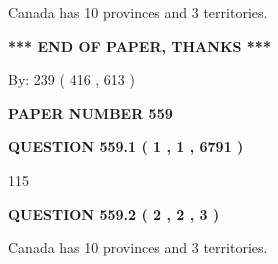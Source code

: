 \documentclass[12pt]{article}
\begin{document}
  
 
 
\noindent{}
 
 
Canada has 10  provinces and 3 territories.
 
 
 
 
   
   
 \vspace{0.2in}
 
   
   
   
   
\vspace{1.0in} 
{\textbf{\large{ *** END OF PAPER, THANKS *** }}} 
   
   
\hspace{1.0in} By: 
 239 ( 416 ,  613 )
   
   
   
   
\newpage 
\setcounter{page}{ 
   559001 } 
   
   
   
   
 {\textbf{ \Large{ PAPER NUMBER  559  }}}
   
   
\vspace{0.2in}
   
   
   
   
   
   
 \vspace{0.2in}
 
 
 
 
   
   
  
\vspace{0.2in}
  
{\textbf{\Large{QUESTION
559.1 
 ( 1 , 1 , 6791 )
}}}
  
  
 
 
\noindent{}

115
 
 
  
\vspace{0.2in}
  
{\textbf{\Large{QUESTION
559.2 
 ( 2 , 2 , 3 )
}}}
  
  
 
 
\noindent{}
 
 
Canada has 10  provinces and 3 territories.
 
\end{document}
